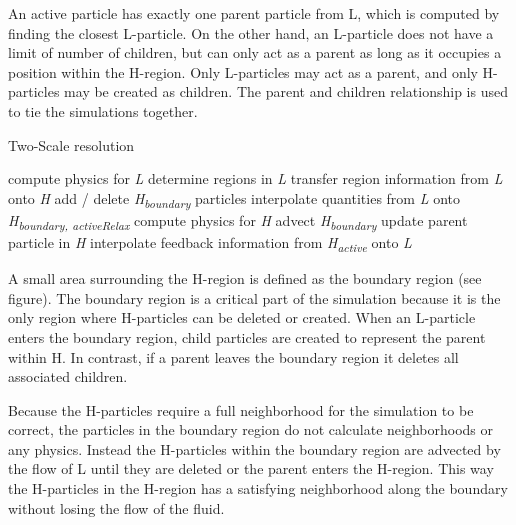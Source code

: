 \documentclass[../../main.tex]{subfiles}
\begin{document}
An active particle has exactly one parent particle from L, which is computed by finding the closest L-particle. On the other hand, an L-particle does not have a limit of number of children, but can only act as a parent as long as it occupies a position within the H-region. Only L-particles may act as a parent, and only H-particles may be created as children. The parent and children relationship is used to tie the simulations together. 


\begin{algorithm}[h]
    \caption{Two-Scale resolution}
    \label{alg:twoscale}
    \begin{algorithmic}[1]
        \State compute physics for \textit{L}
        \State determine regions in \textit{L}
        \State transfer region information from \textit{L} onto \textit{H}
        \State add / delete \textit{\texorpdfstring{H\textsubscript{boundary}}{H boundary}} particles
        \State interpolate quantities from \textit{L} onto \textit{\texorpdfstring{H\textsubscript{boundary, activeRelax}}{H boundary, activeRelax}}
                \State compute physics for \textit{H}
            \State advect \textit{\texorpdfstring{H\textsubscript{boundary}}{H boundary}}
        \EndFor
        \State update parent particle in \textit{H}
        \State interpolate feedback information from \textit{{\texorpdfstring{H\textsubscript{active}}{H active}}} onto \textit{L}
        \EndWhile
   \end{algorithmic}
\end{algorithm}

A small area surrounding the H-region is defined as the boundary region (see figure). The boundary region is a critical part of the simulation because it is the only region where H-particles can be deleted or created. When an L-particle enters the boundary region, child particles are created to represent the parent within H. In contrast, if a parent leaves the boundary region it deletes all associated children. 

Because the H-particles require a full neighborhood for the simulation to be correct, the particles in the boundary region do not calculate neighborhoods or any physics. Instead the H-particles within the boundary region are advected by the flow of L until they are deleted or the parent enters the H-region. This way the H-particles in the H-region has a satisfying neighborhood along the boundary without losing the flow of the fluid. 
\end{document}
